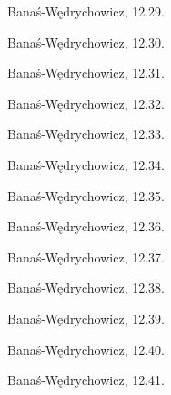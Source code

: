 \begin{integral}
    Banaś-Wędrychowicz, 12.29.
\end{integral}

\begin{integral}
    Banaś-Wędrychowicz, 12.30.
\end{integral}

\begin{integral}
    Banaś-Wędrychowicz, 12.31.
\end{integral}

\begin{integral}
    Banaś-Wędrychowicz, 12.32.
\end{integral}

\begin{integral}
    Banaś-Wędrychowicz, 12.33.
\end{integral}

\begin{integral}
    Banaś-Wędrychowicz, 12.34.
\end{integral}

\begin{integral}
    Banaś-Wędrychowicz, 12.35.
\end{integral}

\begin{integral}
    Banaś-Wędrychowicz, 12.36.
\end{integral}

\begin{integral}
    Banaś-Wędrychowicz, 12.37.
\end{integral}

\begin{integral}
    Banaś-Wędrychowicz, 12.38.
\end{integral}

\begin{integral}
    Banaś-Wędrychowicz, 12.39.
\end{integral}

\begin{integral}
    Banaś-Wędrychowicz, 12.40.
\end{integral}

\begin{integral}
    Banaś-Wędrychowicz, 12.41.
\end{integral}


